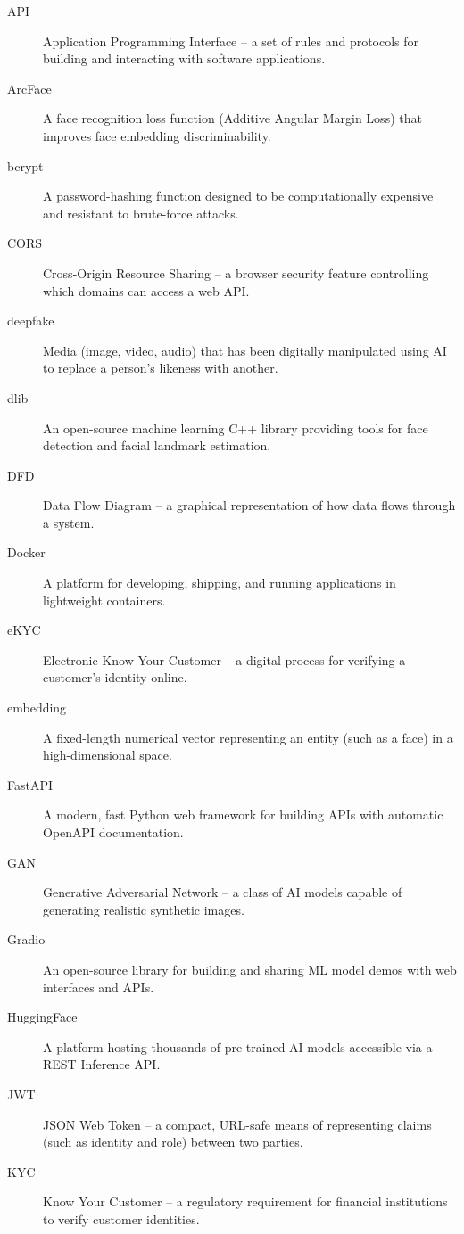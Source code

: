 \begin{description}
    \item[API] Application Programming Interface -- a set of rules and protocols for building and interacting with software applications.
    \item[ArcFace] A face recognition loss function (Additive Angular Margin Loss) that improves face embedding discriminability.
    \item[bcrypt] A password-hashing function designed to be computationally expensive and resistant to brute-force attacks.
    \item[CORS] Cross-Origin Resource Sharing -- a browser security feature controlling which domains can access a web API.
    \item[deepfake] Media (image, video, audio) that has been digitally manipulated using AI to replace a person's likeness with another.
    \item[dlib] An open-source machine learning C++ library providing tools for face detection and facial landmark estimation.
    \item[DFD] Data Flow Diagram -- a graphical representation of how data flows through a system.
    \item[Docker] A platform for developing, shipping, and running applications in lightweight containers.
    \item[eKYC] Electronic Know Your Customer -- a digital process for verifying a customer's identity online.
    \item[embedding] A fixed-length numerical vector representing an entity (such as a face) in a high-dimensional space.
    \item[FastAPI] A modern, fast Python web framework for building APIs with automatic OpenAPI documentation.
    \item[GAN] Generative Adversarial Network -- a class of AI models capable of generating realistic synthetic images.
    \item[Gradio] An open-source library for building and sharing ML model demos with web interfaces and APIs.
    \item[HuggingFace] A platform hosting thousands of pre-trained AI models accessible via a REST Inference API.
    \item[JWT] JSON Web Token -- a compact, URL-safe means of representing claims (such as identity and role) between two parties.
    \item[KYC] Know Your Customer -- a regulatory requirement for financial institutions to verify customer identities.

\end{description}
